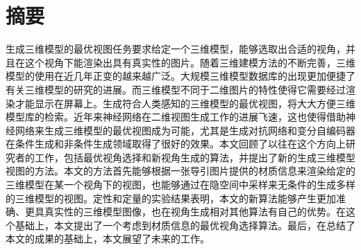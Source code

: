 \documentclass[UTF8,openany,AutoFakeBold,AutoFakeSlant,cs4size]{ctexbook}
\title{}
\author{}
\date{}
\begin{document}
\newcommand{\chineseTitle}{三维模型最优二维视图生成方法研究}
\newcommand{\englishTitle}{Synthesizing best 2D views of 3D models}
\newcommand{\name}{黄道吉}
\newcommand{\studentID}{1600017857}
\newcommand{\school}{元培学院}
\newcommand{\major}{计算机科学与技术}
\newcommand{\advisor}{连宙辉}

\clearpage




\quad
\setcounter{page}{0}
\thispagestyle{empty}
\clearpage



\pagestyle{fancy}
\normalsize
\linespread{1.5}\selectfont
\chapter*{摘要}

生成三维模型的最优视图任务要求给定一个三维模型，能够选取出合适的视角，并且在这个视角下能渲染出具有真实性的图片。随着三维建模方法的不断完善，三维模型的使用在近几年正变的越来越广泛。大规模三维模型数据库的出现更加便捷了有关三维模型的研究的进展。而三维模型不同于二维图片的特性使得它需要经过渲染才能显示在屏幕上。生成符合人类感知的三维模型的最优视图，将大大方便三维模型库的检索。近年来神经网络在二维视图生成工作的进展飞速，这也使得借助神经网络来生成三维模型的最优视图成为可能，尤其是生成对抗网络和变分自编码器在条件生成和非条件生成领域取得了很好的效果。本文回顾了以往在这个方向上研究者的工作，包括最优视角选择和新视角生成的算法，并提出了新的生成三维模型视图的方法。本文的方法首先能够根据一张导引图片提供的材质信息来渲染给定的三维模型在某一个视角下的视图，也能够通过在隐空间中采样来无条件的生成多样的三维模型的视图。定性和定量的实验结果表明，本文的新算法能够产生更加准确、更具真实性的三维模型图像，也在视角生成相对其他算法有自己的优势。在这个基础上，本文提出了一个考虑到材质信息的最优视角选择算法。最后，在总结了本文的成果的基础上，本文展望了未来的工作。

\bigskip
{}



{
	\fancyhf{} %



	\fancyfoot[CO,CE]{~\thepage~}

	\renewcommand{\headrulewidth}{0.7pt} %

	\renewcommand{\footrulewidth}{0pt} %
}
\end{document}
